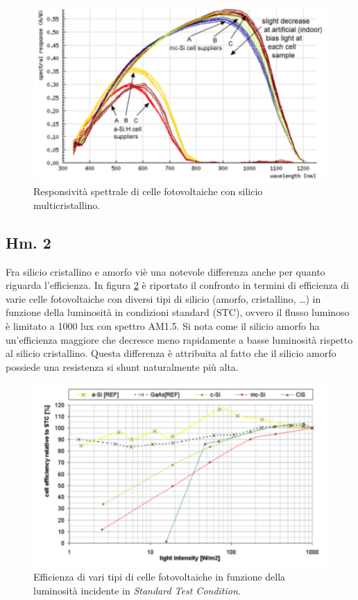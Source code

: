 \documentclass[journal, a4paper]{IEEEtran}
\begin{document}
\begin{figure}[htp]
\centering
\includegraphics[scale=.5]{mc-Si_SR}
\caption{Responsività spettrale di celle fotovoltaiche con silicio multicristallino.}
\label{fig:silres2}
\end{figure}

\subsection{Hm. 2}

Fra silicio cristallino e amorfo viè una notevole differenza anche per quanto riguarda l'efficienza. In figura \ref{fig:efficiency} è riportato il confronto in termini di efficienza di varie celle fotovoltaiche con diversi tipi di silicio (amorfo, cristallino, \ldots) in funzione della luminosità in condizioni standard (STC), ovvero il flusso luminoso è limitato a 1000 lux con spettro AM1.5. Si nota come il silicio amorfo ha un'efficienza maggiore che decresce meno rapidamente a basse luminosità rispetto al silicio cristallino. Questa differenza è attribuita al fatto che il silicio amorfo possiede una resistenza si shunt naturalmente più alta.

\begin{figure}[htp]
\centering
\includegraphics[scale=.5]{efficiency}
\caption{Efficienza di vari tipi di celle fotovoltaiche in funzione della luminosità incidente in \textit{Standard Test Condition}.}
\label{fig:efficiency}
\end{figure}
\end{document}

